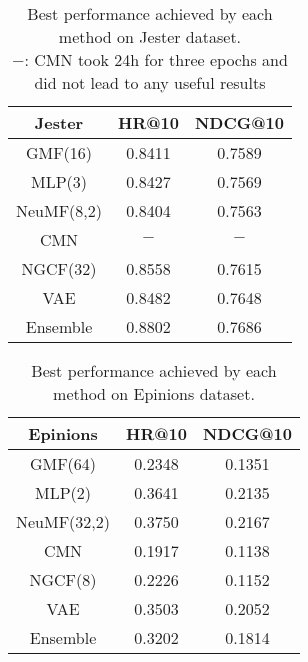 \begin{table}[h]
    \centering
    \begin{tabular}{c|c|c}
        \hline
        Jester & HR@10 & NDCG@10 \\
        \hline
        GMF(16)    & 0.8411 & 0.7589 \\
        MLP(3)     & 0.8427 & 0.7569 \\
        NeuMF(8,2) & 0.8404 & 0.7563 \\
        CMN        & $-$ & $-$ \\
        NGCF(32)   & 0.8558	& 0.7615 \\
        VAE        & 0.8482 & 0.7648 \\
        Ensemble   & 0.8802 & 0.7686
    \end{tabular}
    \caption{Best performance achieved by each method on Jester dataset.\\
    {\scriptsize $-$: CMN took 24h for three epochs and did not lead to any useful results}}
    \label{tab:jester}
\end{table}
\begin{table}[h]
    \centering
    \begin{tabular}{c|c|c}
        \hline
        Epinions & HR@10 & NDCG@10 \\
        \hline
        GMF(64)     & 0.2348 & 0.1351 \\
        MLP(2)      & 0.3641 & 0.2135 \\
        NeuMF(32,2) & 0.3750 & 0.2167 \\
        CMN         & 0.1917 & 0.1138  \\
        NGCF(8)     & 0.2226 & 0.1152 \\
        VAE         & 0.3503 & 0.2052 \\
        Ensemble    & 0.3202 & 0.1814
    \end{tabular}
    \caption{Best performance achieved by each method on Epinions dataset.}
    \label{tab:epinions}
\end{table}


